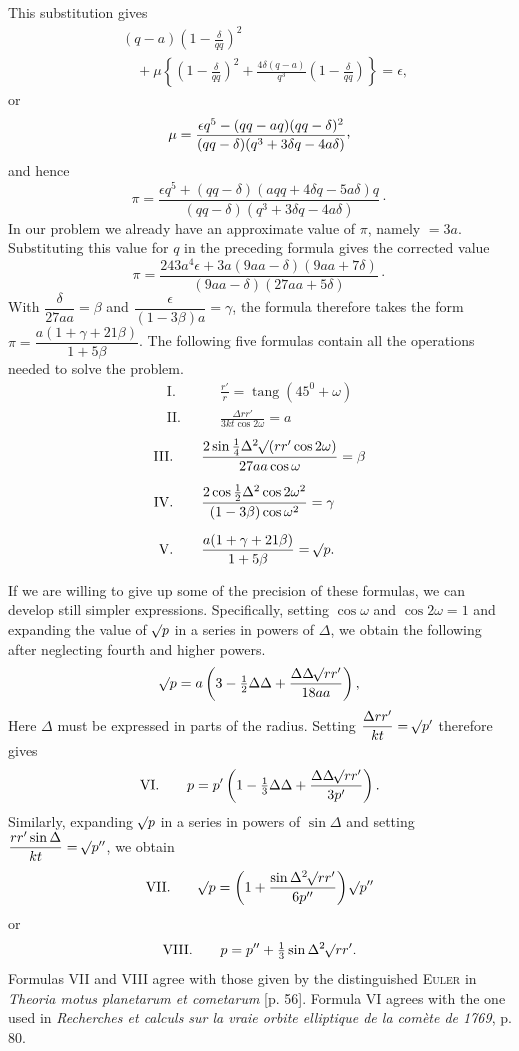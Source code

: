This substitution gives
\[
\begin{aligned}
&(q-a)\left(1-\frac{\delta}{qq}\right)^2\\[4pt]
&\quad+\mu\left\{\left(1-\frac{\delta}{qq}\right)^2+\frac{4\delta(q-a)}{q^3}\left(1-\frac{\delta}{qq}\right)\right\}=\epsilon,
\end{aligned}
\]
or
\[
\mu=\frac{\epsilon q^5-(qq-aq)(qq-\delta)^2}{(qq-\delta)(q^3+3\delta q-4a\delta)}\mathpunct{\raisebox{.45ex}{,}}
\]
and hence
\[
\pi=\frac{\epsilon q^5+(qq-\delta)(aqq+4\delta q-5a\delta)q}{(qq-\delta)(q^3+3\delta q-4a\delta)}\mathpunct{\cdot}
\]
In our problem we already have an approximate value of $\pi$, namely $=3a$. Substituting this value for $q$ in the preceding formula gives the corrected value
\[
\pi=\frac{243a^4\epsilon+3a(9aa-\delta)(9aa+7\delta)}{(9aa-\delta)(27aa+5\delta)}\mathpunct{\cdot}
\]
With $\dfrac{\delta}{27aa}=\beta$ and $\dfrac{\epsilon}{(1-3\beta)a}=\gamma$, the formula therefore takes the form $\pi=\dfrac{a(1+\gamma+21\beta)}{1+5\beta}$. The following five formulas contain all the operations needed to solve the problem.
\[
\begin{aligned}
\mathrm{I.}\qquad&\frac{r'}{r}=\operatorname{tang}(45^0+\omega)\\[6pt]
\mathrm{II.}\qquad&\frac{\Delta rr'}{3kt\cos2\omega}=a
\end{aligned}
\]
\[
\begin{aligned}
\mathrm{III.}\qquad&\frac{2\sin\tfrac14\Delta^2\mathord{{}^{}\!\surd}(rr'\cos2\omega)}{27aa\cos\omega}=\beta\\[6pt]
\mathrm{IV.}\qquad&\frac{2\cos\tfrac12\Delta^2\cos2\omega^2}{(1-3\beta)\cos\omega^2}=\gamma\\[6pt]
\mathrm{V.}\qquad&\frac{a(1+\gamma+21\beta)}{1+5\beta}=\mathord{{}^{}\!\surd}p.
\end{aligned}
\]

If we are willing to give up some of the precision of these formulas, we can develop still simpler expressions. Specifically, setting $\cos\omega$ and $\cos2\omega=1$ and expanding the value of $\mathord{{}^{}\!\surd}p$ in a series in powers of $\Delta$, we obtain the following after neglecting fourth and higher powers.
\[
\mathord{{}^{}\!\surd}p=a\left(3-\tfrac12\Delta\Delta+\frac{\Delta\Delta\mathord{{}^{}\!\surd}rr'}{18aa}\right),
\]
Here $\Delta$ must be expressed in parts of the radius. Setting $\dfrac{\Delta rr'}{kt}=\mathord{{}^{}\!\surd}p'$ therefore gives
\[
\mathrm{VI.}\qquad p=p'\left(1-\tfrac13\Delta\Delta+\frac{\Delta\Delta\mathord{{}^{}\!\surd}rr'}{3p'}\right).
\]
Similarly, expanding $\mathord{{}^{}\!\surd}p$ in a series in powers of $\sin\Delta$ and setting $\dfrac{rr'\sin\Delta}{kt}=\mathord{{}^{}\!\surd}p''$, we obtain
\[
\mathrm{VII.}\qquad\mathord{{}^{}\!\surd}p=\left(1+\frac{\sin\Delta^2\mathord{{}^{}\!\surd}rr'}{6p''}\right)\mathord{{}^{}\!\surd}p''
\]
or
\[
\mathrm{VIII.}\qquad p=p''+\tfrac13\sin\Delta^2\mathord{{}^{}\!\surd}rr'.
\]
Formulas VII and VIII agree with those given by the distinguished \textsc{Euler} in \textit{Theoria motus planetarum et cometarum} [p. 56]. Formula VI agrees with the one used in \textit{Recherches et calculs sur la vraie orbite elliptique de la comète de 1769}, p. 80.
